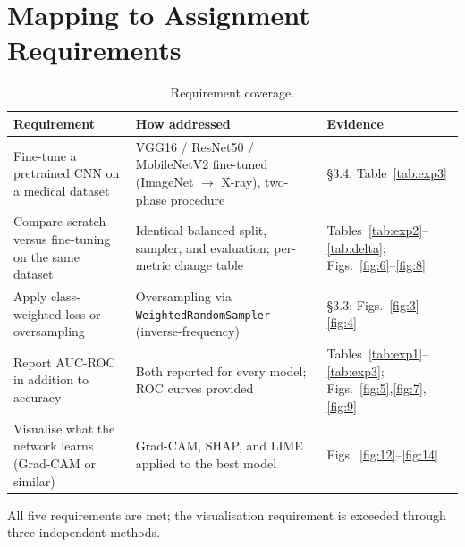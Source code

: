 \documentclass[11pt,a4paper]{article}
\numberwithin{figure}{section}
\numberwithin{table}{section}
\let\oldsection\section
\renewcommand{\section}{\clearpage\oldsection}
\begin{document}
\section{Mapping to Assignment Requirements}
\begin{table}[H]
\centering
\caption{Requirement coverage.}
\label{tab:appA}
\begin{tabularx}{\textwidth}{XXl}
\toprule
Requirement & How addressed & Evidence \\
\midrule
Fine-tune a pretrained CNN on a medical dataset & VGG16 / ResNet50 / MobileNetV2 fine-tuned (ImageNet $\rightarrow$ X-ray), two-phase procedure & \S3.4; Table~\ref{tab:exp3} \\
Compare scratch versus fine-tuning on the same dataset & Identical balanced split, sampler, and evaluation; per-metric change table & Tables~\ref{tab:exp2}--\ref{tab:delta}; Figs.~\ref{fig:6}--\ref{fig:8} \\
Apply class-weighted loss or oversampling & Oversampling via \texttt{WeightedRandomSampler} (inverse-frequency) & \S3.3; Figs.~\ref{fig:3}--\ref{fig:4} \\
Report AUC-ROC in addition to accuracy & Both reported for every model; ROC curves provided & Tables~\ref{tab:exp1}--\ref{tab:exp3}; Figs.~\ref{fig:5},\ref{fig:7},\ref{fig:9} \\
Visualise what the network learns (Grad-CAM or similar) & Grad-CAM, SHAP, and LIME applied to the best model & Figs.~\ref{fig:12}--\ref{fig:14} \\
\bottomrule
\end{tabularx}
\end{table}
All five requirements are met; the visualisation requirement is exceeded through three independent
methods.
\end{document}
